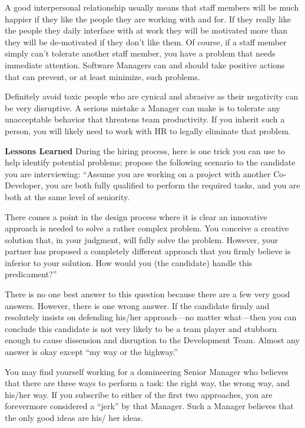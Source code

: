 \documentclass{book}
\begin{document}
A good interpersonal relationship usually means that staff
members will be much happier if they like the people they are
working with and for. If they really like the people they daily
interface with at work they will be motivated more than they
will be de-motivated if they don’t like them. Of course, if a
staff member simply can’t tolerate another staff member, you
have a problem that needs immediate attention. Software
Managers can and should take positive actions that can prevent,
or at least minimize, such problems.

Definitely avoid toxic people who are cynical and abrasive
as their negativity can be very disruptive. A serious mistake
a Manager can make is to tolerate any unacceptable
behavior that threatens team productivity. If you inherit such a person, you will likely need to work with HR to legally
eliminate that problem.

\textbf{Lessons Learned} During the hiring process,
here is one trick you can use to help identify
potential problems; propose the following scenario
to the candidate you are interviewing:
“Assume you are working on a project with
another Co-Developer, you are both fully qualified
to perform the required tasks, and you are
both at the same level of seniority.

There comes a point in the design process
where it is clear an innovative approach is needed
to solve a rather complex problem. You conceive
a creative solution that, in your judgment, will
fully solve the problem. However, your partner
has proposed a completely different approach
that you firmly believe is inferior to your solution.
How would you (the candidate) handle this
predicament?”

There is no one best answer to this question
because there are a few very good answers.
However, there is one wrong answer. If the candidate
firmly and resolutely insists on defending
his/her approach—no matter what—then you
can conclude this candidate is not very likely to
be a team player and stubborn enough to cause
dissension and disruption to the Development
Team. Almost any answer is okay except “my
way or the highway.”

You may find yourself working for a domineering
Senior Manager who believes that there are three ways to
perform a task: the right way, the wrong way, and his/her
way. If you subscribe to either of the first two approaches,
you are forevermore considered a “jerk” by that Manager.
Such a Manager believes that the only good ideas are his/
her ideas.
\end{document}
